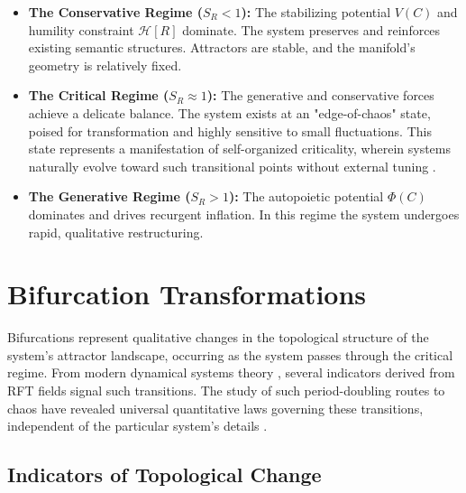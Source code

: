 \begin{itemize}

    \item \textbf{The Conservative Regime (\(S_R < 1\)):} The stabilizing potential \(V(C)\) and humility constraint \(\mathcal{H}[R]\) dominate. The system preserves and reinforces existing semantic structures. Attractors are stable, and the manifold's geometry is relatively fixed.

    \item \textbf{The Critical Regime (\(S_R \approx 1\)):} The generative and conservative forces achieve a delicate balance. The system exists at an "edge-of-chaos" state, poised for transformation and highly sensitive to small fluctuations. This state represents a manifestation of self-organized criticality, wherein systems naturally evolve toward such transitional points without external tuning \autocite{BakTangWiesenfeld1987, Kauffman1993}.

    \item \textbf{The Generative Regime (\(S_R > 1\)):} The autopoietic potential \(\Phi(C)\) dominates and drives recurgent inflation. In this regime the system undergoes rapid, qualitative restructuring.

\end{itemize}


\section{Bifurcation Transformations}
\label{11.3:bifurcation_transformations}

Bifurcations represent qualitative changes in the topological structure of the system's attractor landscape, occurring as the system passes through the critical regime. From modern dynamical systems theory \autocite{Poincare1892, Lorenz1963, Smale1967, RuelleTakens1971, GuckenheimerHolmes1983, Kuznetsov2004, Strogatz2014}, several indicators derived from RFT fields signal such transitions. The study of such period-doubling routes to chaos have revealed universal quantitative laws governing these transitions, independent of the particular system's details \autocite{Feigenbaum1978}.


\subsection{Indicators of Topological Change}
\label{11.3.1:indicators_of_topological_change}

